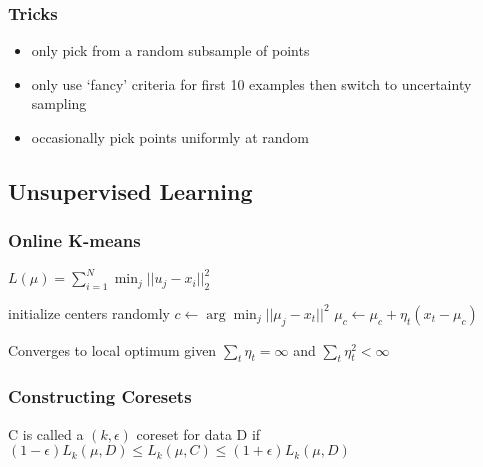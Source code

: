 \documentclass[10pt,parskip]{scrartcl}
\begin{document}
\begin{multicols*}{3}
\subsubsection{Tricks} %
\label{ssub:tricks}
\begin{itemize}
	\item only pick from a random subsample of points
	\item only use `fancy' criteria for first 10 examples then switch to uncertainty sampling 
	\item occasionally pick points uniformly at random
\end{itemize}

\subsection{Unsupervised Learning} %
\label{sub:unsupervised_learning}
\subsubsection{Online K-means} %
\label{ssub:k_means}

$L(\mu) = \sum_{i=1}^N \min_j ||u_j - x_i||_2^2$
\begin{mdframed}
	\begin{algorithmic}
		\State initialize centers randomly
			\State $c \gets \arg\min_j||\mu_j-x_t||^2$
			\State $\mu_c \gets \mu_c + \eta_t(x_t-\mu_c)$
		\EndFor
	\end{algorithmic}
\end{mdframed}
Converges to local optimum given $\sum_t \eta_t = \infty$ and $\sum_t \eta_t^2 < \infty$
\subsubsection{Constructing Coresets} %
\label{ssub:constructing_coresets}
C is called a $(k,\epsilon)$ coreset for data D if \\
$(1-\epsilon)L_k(\mu,D) \leq L_k(\mu,C) \leq (1+\epsilon)L_k(\mu,D)$


\end{multicols*}
\end{document}

